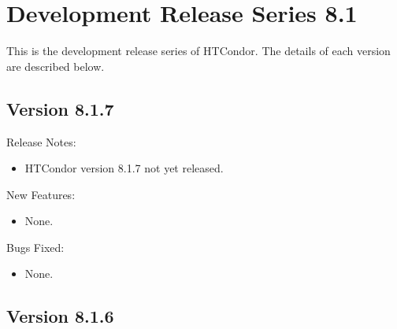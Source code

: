 
\section{\label{sec:History-8-1}Development Release Series 8.1}

This is the development release series of HTCondor.
The details of each version are described below.


\subsection*{\label{sec:New-8-1-7}Version 8.1.7}

\noindent Release Notes:

\begin{itemize}

\item HTCondor version 8.1.7 not yet released.

\end{itemize}


\noindent New Features:

\begin{itemize}

\item None.

\end{itemize}

\noindent Bugs Fixed:

\begin{itemize}

\item None.

\end{itemize}

\subsection*{\label{sec:New-8-1-6}Version 8.1.6}

